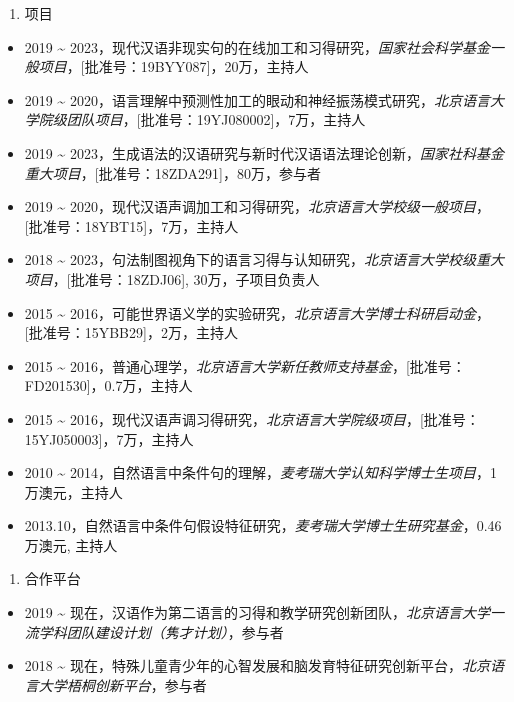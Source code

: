 \documentclass[12pt,]{article}
\providecommand{\tightlist}{%
  \setlength{\itemsep}{0pt}\setlength{\parskip}{0pt}}
\begin{document}
\begin{enumerate}
\def\labelenumi{\arabic{enumi}.}
\tightlist
\item
  项目
\end{enumerate}

\begin{itemize}
\item
  2019 \textasciitilde{}
  2023，现代汉语非现实句的在线加工和习得研究，\emph{国家社会科学基金一般项目}，{[}批准号：19BYY087{]}，20万，主持人
\item
  2019 \textasciitilde{}
  2020，语言理解中预测性加工的眼动和神经振荡模式研究，\emph{北京语言大学院级团队项目}，{[}批准号：19YJ080002{]}，7万，主持人
\item
  2019 \textasciitilde{}
  2023，生成语法的汉语研究与新时代汉语语法理论创新，\emph{国家社科基金重大项目}，{[}批准号：18ZDA291{]}，80万，参与者
\item
  2019 \textasciitilde{}
  2020，现代汉语声调加工和习得研究，\emph{北京语言大学校级一般项目}，{[}批准号：18YBT15{]}，7万，主持人
\item
  2018 \textasciitilde{}
  2023，句法制图视角下的语言习得与认知研究，\emph{北京语言大学校级重大项目}，{[}批准号：18ZDJ06{]},
  30万，子项目负责人
\item
  2015 \textasciitilde{}
  2016，可能世界语义学的实验研究，\emph{北京语言大学博士科研启动金}，{[}批准号：15YBB29{]}，2万，主持人
\item
  2015 \textasciitilde{}
  2016，普通心理学，\emph{北京语言大学新任教师支持基金}，{[}批准号：FD201530{]}，0.7万，主持人
\item
  2015 \textasciitilde{}
  2016，现代汉语声调习得研究，\emph{北京语言大学院级项目}，{[}批准号：15YJ050003{]}，7万，主持人
\item
  2010 \textasciitilde{}
  2014，自然语言中条件句的理解，\emph{麦考瑞大学认知科学博士生项目}，1万澳元，主持人
\item
  2013.10，自然语言中条件句假设特征研究，\emph{麦考瑞大学博士生研究基金}，0.46万澳元,
  主持人
\end{itemize}

\begin{enumerate}
\def\labelenumi{\arabic{enumi}.}
\setcounter{enumi}{1}
\tightlist
\item
  合作平台
\end{enumerate}

\begin{itemize}
\item
  2019 \textasciitilde{}
  现在，汉语作为第二语言的习得和教学研究创新团队，\emph{北京语言大学一流学科团队建设计划（隽才计划）}，参与者
\item
  2018 \textasciitilde{}
  现在，特殊儿童青少年的心智发展和脑发育特征研究创新平台，\emph{北京语言大学梧桐创新平台}，参与者
\end{itemize}
\end{document}
